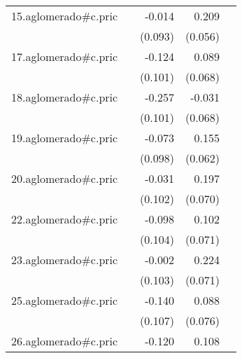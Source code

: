 {\begin{longtable}{l*{4}{D{.}{.}{-1}}}
\addlinespace
15.aglomerado#c.pric&                     &      -0.014         &       0.209\sym{***}&                     \\
            &                     &     (0.093)         &     (0.056)         &                     \\
\addlinespace
17.aglomerado#c.pric&                     &      -0.124         &       0.089         &                     \\
            &                     &     (0.101)         &     (0.068)         &                     \\
\addlinespace
18.aglomerado#c.pric&                     &      -0.257\sym{*}  &      -0.031         &                     \\
            &                     &     (0.101)         &     (0.068)         &                     \\
\addlinespace
19.aglomerado#c.pric&                     &      -0.073         &       0.155\sym{*}  &                     \\
            &                     &     (0.098)         &     (0.062)         &                     \\
\addlinespace
20.aglomerado#c.pric&                     &      -0.031         &       0.197\sym{**} &                     \\
            &                     &     (0.102)         &     (0.070)         &                     \\
\addlinespace
22.aglomerado#c.pric&                     &      -0.098         &       0.102         &                     \\
            &                     &     (0.104)         &     (0.071)         &                     \\
\addlinespace
23.aglomerado#c.pric&                     &      -0.002         &       0.224\sym{**} &                     \\
            &                     &     (0.103)         &     (0.071)         &                     \\
\addlinespace
25.aglomerado#c.pric&                     &      -0.140         &       0.088         &                     \\
            &                     &     (0.107)         &     (0.076)         &                     \\
\addlinespace
26.aglomerado#c.pric&                     &      -0.120         &       0.108         &                     \\

\end{longtable}}
